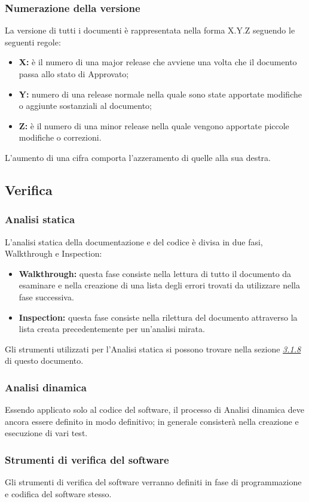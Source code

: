 		\subsubsection{Numerazione della versione}
		\label{3.2.2}
			La versione di tutti i documenti è rappresentata nella forma X.Y.Z seguendo le seguenti regole:
			\begin{itemize}
				\item \textbf{X:} è il numero di una major release che avviene una volta che il documento passa allo stato di Approvato;
				\item \textbf{Y:} numero di una release normale nella quale sono state apportate modifiche o aggiunte sostanziali al documento;
				\item \textbf{Z:} è il numero di una minor release nella quale vengono apportate piccole modifiche o correzioni.
			\end{itemize}
		L'aumento di una cifra comporta l'azzeramento di quelle alla sua destra. \newline
		
	\subsection{Verifica}
		\subsubsection{Analisi statica}
			L'analisi statica della documentazione e del codice è divisa in due fasi, Walkthrough e Inspection:
			\begin{itemize}
				\item \textbf{Walkthrough:} questa fase consiste nella lettura di tutto il documento da esaminare e nella creazione di una lista degli errori trovati da utilizzare nella fase successiva.
				\item \textbf{Inspection:} questa fase consiste nella rilettura del documento attraverso la lista creata precedentemente per un'analisi mirata. \newline
			\end{itemize}
		Gli strumenti utilizzati per l'Analisi statica si possono trovare nella sezione \hyperref[3.1.8]{\textit{\underline{3.1.8}}} di questo documento.\newline
		\subsubsection{Analisi dinamica}
			Essendo applicato solo al codice del software, il processo di Analisi dinamica deve ancora essere definito in modo definitivo; in generale consisterà nella creazione e esecuzione di vari test.\newline
		\subsubsection{Strumenti di verifica del software}
		Gli strumenti di verifica del software verranno definiti in fase di programmazione e codifica del software stesso.\newline
		
	
	